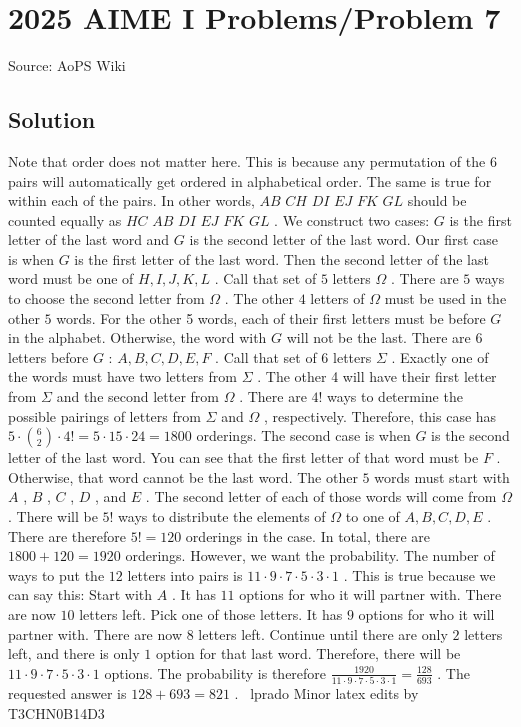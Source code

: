 \documentclass[12pt]{article}
\begin{document}
\section*{{2025 AIME I Problems/Problem 7}}
Source: AoPS Wiki

\subsection*{Solution}
Note that order does not matter here. This is because any permutation of the $6$ pairs will automatically get ordered in alphabetical order. The same is true for within each of the pairs. In other words, $AB$ $CH$ $DI$ $EJ$ $FK$ $GL$ should be counted equally as $HC$ $AB$ $DI$ $EJ$ $FK$ $GL$ . We construct two cases: $G$ is the first letter of the last word and $G$ is the second letter of the last word. Our first case is when $G$ is the first letter of the last word. Then the second letter of the last word must be one of $H, I, J, K, L$ . Call that set of $5$ letters $\Omega$ . There are $5$ ways to choose the second letter from $\Omega$ . The other $4$ letters of $\Omega$ must be used in the other $5$ words. For the other 5 words, each of their first letters must be before $G$ in the alphabet. Otherwise, the word with $G$ will not be the last. There are $6$ letters before $G$ : $A,B,C,D,E,F$ . Call that set of $6$ letters $\Sigma$ . Exactly one of the words must have two letters from $\Sigma$ . The other 4 will have their first letter from $\Sigma$ and the second letter from $\Omega$ . There are $4!$ ways to determine the possible pairings of letters from $\Sigma$ and $\Omega$ , respectively. Therefore, this case has $5 \cdot {6\choose{2}} \cdot 4! = 5 \cdot 15 \cdot 24 = 1800$ orderings. The second case is when $G$ is the second letter of the last word. You can see that the first letter of that word must be $F$ . Otherwise, that word cannot be the last word. The other $5$ words must start with $A$ , $B$ , $C$ , $D$ , and $E$ . The second letter of each of those words will come from $\Omega$ . There will be $5!$ ways to distribute the elements of $\Omega$ to one of $A, B, C, D, E$ . There are therefore $5! = 120$ orderings in the case. In total, there are $1800+120 = 1920$ orderings. However, we want the probability. The number of ways to put the $12$ letters into pairs is $11 \cdot 9 \cdot 7 \cdot 5 \cdot 3 \cdot 1$ . This is true because we can say this: Start with $A$ . It has $11$ options for who it will partner with. There are now $10$ letters left. Pick one of those letters. It has $9$ options for who it will partner with. There are now $8$ letters left. Continue until there are only $2$ letters left, and there is only $1$ option for that last word. Therefore, there will be $11 \cdot 9 \cdot 7 \cdot 5 \cdot 3 \cdot 1$ options. The probability is therefore $\frac{1920}{11 \cdot 9 \cdot 7 \cdot 5 \cdot 3 \cdot 1} = \frac{128}{693}$ . The requested answer is $128 + 693 = \boxed{821}$ . ~lprado Minor latex edits by T3CHN0B14D3
\end{document}
